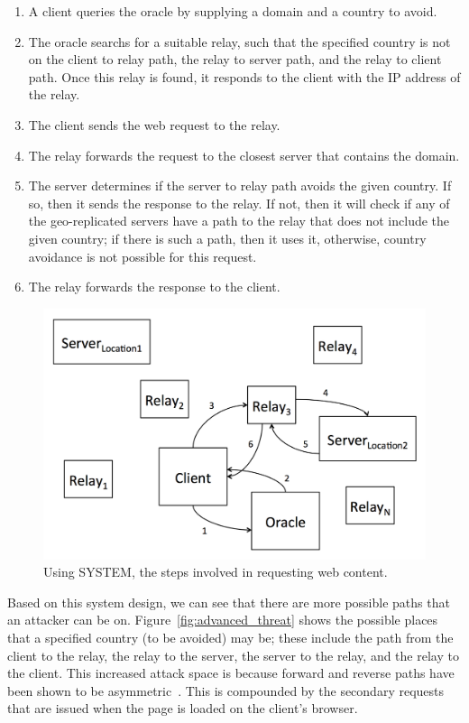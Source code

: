 \begin{enumerate}
\item A client queries the oracle by supplying a domain and a country to avoid.  
\item The oracle searchs for a suitable relay, such that the specified country is not on the client to relay path, the relay to server path, and the relay to client path.  Once this relay is found, it responds to the client with the IP address of the relay.
\item The client sends the web request to the relay.
\item The relay forwards the request to the closest server that contains the domain.
\item The server determines if the server to relay path avoids the given country.  If so, then it sends the response to the relay. If not, then it will check if any of the geo-replicated servers have a path to the relay that does not include the given country; if there is such a path, then it uses it, otherwise, country avoidance is not possible for this request.
\item The relay forwards the response to the client.
\end{enumerate}

\begin{figure}
\centering
\includegraphics[width=.5\textwidth]{system_overview}
\caption{Using SYSTEM, the steps involved in requesting web content.}
\label{fig:domains}
\end{figure}

Based on this system design, we can see that there are more possible paths that an attacker can be on.  Figure~\ref{fig:advanced_threat} shows the possible places that a specified country (to be avoided) may be; these include the path from the client to the relay, the relay to the server, the server to the relay, and the relay to the client.  This increased attack space is because forward and reverse paths have been shown to be asymmetric~\cite{he2005routing}.    This is compounded by the secondary requests that are issued when the page is loaded on the client's browser.  

